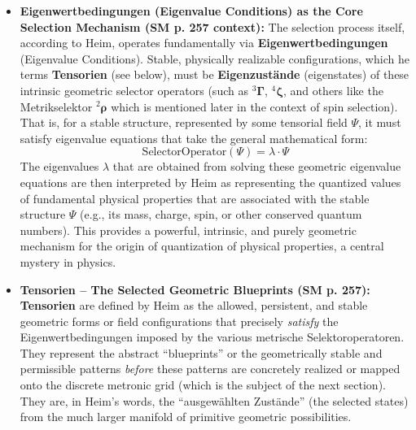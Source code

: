 \documentclass[12pt]{article}
\newcommand{\q}[1]{\enquote{#1}}
\newcommand{\fundamentalkondensor}{{}^3\bm{\Gamma}}
\newcommand{\strukturkompressor}{{}^4\bm{\zeta}}
\begin{document}
\begin{itemize}
    \item \textbf{Eigenwertbedingungen (Eigenvalue Conditions) as the Core Selection Mechanism (SM p. 257 context):}
    The selection process itself, according to Heim, operates fundamentally via \textbf{Eigenwertbedingungen} (Eigenvalue Conditions). Stable, physically realizable configurations, which he terms \textbf{Tensorien} (see below), must be \textbf{Eigenzustände} (eigenstates) of these intrinsic geometric selector operators (such as \( \fundamentalkondensor \), \( \strukturkompressor \), and others like the Metrikselektor \( {}^2\bm{\rho} \) which is mentioned later in the context of spin selection). That is, for a stable structure, represented by some tensorial field \( \Psi \), it must satisfy eigenvalue equations that take the general mathematical form:
    \[ \text{SelectorOperator}(\Psi) = \lambda \cdot \Psi \]
    The eigenvalues \( \lambda \) that are obtained from solving these geometric eigenvalue equations are then interpreted by Heim as representing the quantized values of fundamental physical properties that are associated with the stable structure \( \Psi \) (e.g., its mass, charge, spin, or other conserved quantum numbers). This provides a powerful, intrinsic, and purely geometric mechanism for the origin of quantization of physical properties, a central mystery in physics.

    \item \textbf{Tensorien – The Selected Geometric Blueprints (SM p. 257):}
    \textbf{Tensorien} are defined by Heim as the allowed, persistent, and stable geometric forms or field configurations that precisely \textit{satisfy} the Eigenwertbedingungen imposed by the various metrische Selektoroperatoren. They represent the abstract \q{blueprints} or the geometrically stable and permissible patterns \textit{before} these patterns are concretely realized or mapped onto the discrete metronic grid (which is the subject of the next section). They are, in Heim's words, the \q{ausgewählten Zustände} (the selected states) from the much larger manifold of primitive geometric possibilities.


\end{itemize}
\end{document}
